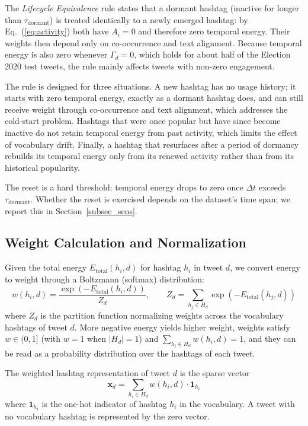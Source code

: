 \documentclass[pdflatex,sn-mathphys-num]{sn-jnl}%
\begin{document}
The \emph{Lifecycle Equivalence} rule states that a dormant hashtag (inactive for longer than $\tau_{\text{dormant}}$) is treated identically to a newly emerged hashtag: by Eq.~(\ref{eq:activity}) both have $A_i = 0$ and therefore zero temporal energy. Their weights then depend only on co-occurrence and text alignment. Because temporal energy is also zero whenever $\Gamma_d = 0$, which holds for about half of the Election 2020 test tweets, the rule mainly affects tweets with non-zero engagement.

The rule is designed for three situations. A new hashtag has no usage history; it starts with zero temporal energy, exactly as a dormant hashtag does, and can still receive weight through co-occurrence and text alignment, which addresses the cold-start problem. Hashtags that were once popular but have since become inactive do not retain temporal energy from past activity, which limits the effect of vocabulary drift. Finally, a hashtag that resurfaces after a period of dormancy rebuilds its temporal energy only from its renewed activity rather than from its historical popularity.

The reset is a hard threshold: temporal energy drops to zero once $\Delta t$ exceeds $\tau_{\text{dormant}}$. Whether the reset is exercised depends on the dataset's time span; we report this in Section~\ref{subsec_sens}.

\subsection{Weight Calculation and Normalization}\label{subsec11}

Given the total energy $E_{\text{total}}(h_i, d)$ for hashtag $h_i$ in tweet $d$, we convert energy to weight through a Boltzmann (softmax) distribution:
\begin{equation}
w(h_i, d) = \frac{\exp(-E_{\text{total}}(h_i, d))}{Z_d}, \qquad Z_d = \sum_{h_j \in H_d} \exp(-E_{\text{total}}(h_j, d))
\label{eq:weight}
\end{equation}
where $Z_d$ is the partition function normalizing weights across the vocabulary hashtags of tweet $d$. More negative energy yields higher weight, weights satisfy $w \in (0, 1]$ (with $w = 1$ when $|H_d| = 1$) and $\sum_{h_i \in H_d} w(h_i, d) = 1$, and they can be read as a probability distribution over the hashtags of each tweet.

The weighted hashtag representation of tweet $d$ is the sparse vector
\begin{equation}
\mathbf{x}_d = \sum_{h_i \in H_d} w(h_i, d) \cdot \mathbf{1}_{h_i}
\label{eq:representation}
\end{equation}
where $\mathbf{1}_{h_i}$ is the one-hot indicator of hashtag $h_i$ in the vocabulary. A tweet with no vocabulary hashtag is represented by the zero vector.
\end{document}
